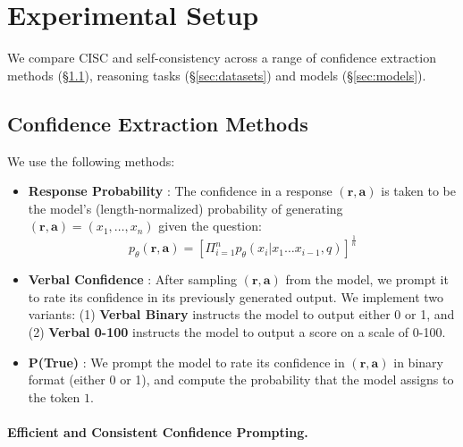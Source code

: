 \section{Experimental Setup}
\label{sec:setup}

We compare CISC and self-consistency across a range of confidence extraction methods (\S\ref{sec:conf-methods}), reasoning tasks (\S\ref{sec:datasets}) and models (\S\ref{sec:models}).

\subsection{Confidence Extraction Methods}
\label{sec:conf-methods}

We use the following methods: 

\begin{itemize}[itemsep=1pt, topsep=2pt,leftmargin=*]
\item \textbf{Response Probability} \cite{wang2022self}: The confidence in a response $(\textbf{r}, \textbf{a})$  is taken to be the model's (length-normalized) probability of generating $(\textbf{r}, \textbf{a})=(x_1, \dots, x_n)$ given the question:$$p_\theta(\textbf{r}, \textbf{a}) = \left[\Pi_{i=1}^n p_\theta (x_i \vert x_1\dots x_{i-1}, q)\right]^\frac{1}{n}$$

\item \textbf{Verbal Confidence} \cite{lin2022teaching}: After sampling $(\textbf{r},\textbf{a})$ from the model, we prompt it to rate its confidence in its previously generated output. We implement two variants: (1) \textbf{Verbal Binary} instructs the model to output either 0 or 1, and (2) \textbf{Verbal 0-100} instructs the model to output a score on a scale of 0-100.

\item \textbf{P(True)} \citet{kadavath2022language}: We prompt the model to rate its confidence in $(\textbf{r},\textbf{a})$ in binary format (either 0 or 1), and compute the probability that the model assigns to the token $1$.%

\end{itemize}


\paragraph{Efficient and Consistent Confidence Prompting.}

